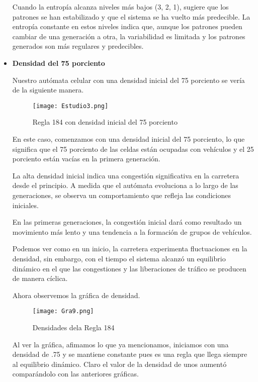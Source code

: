\documentclass{article}
\begin{document}
\begin{itemize}
		Cuando la entropía alcanza niveles más bajos (3, 2, 1), sugiere que los patrones se han estabilizado y que el sistema se ha vuelto más predecible. La entropía constante en estos niveles indica que, aunque los patrones pueden cambiar de una generación a otra, la variabilidad es limitada y los patrones generados son más regulares y predecibles.
		
		\item \textbf{Densidad del 75 porciento}
		
		Nuestro autómata celular con una densidad inicial del 75 porciento se vería de la siguiente manera.
		
		\begin{figure}[h]
			\centering       
			\texttt{[image: Estudio3.png]}
			\caption{Regla 184 con densidad inicial del 75 porciento}
			\label{fig:mi_imagen1}
		\end{figure}
		
		\vspace{300pt}
		En este caso, comenzamos con una densidad inicial del 75 porciento, lo que significa que el 75 porciento de las celdas están ocupadas con vehículos y el 25 porciento están vacías en la primera generación.
		
		La alta densidad inicial indica una congestión significativa en la carretera desde el principio. A medida que el autómata evoluciona a lo largo de las generaciones, se observa un comportamiento que refleja las condiciones iniciales.
		
		En las primeras generaciones, la congestión inicial dará como resultado un movimiento más lento y una tendencia a la formación de grupos de vehículos.
		
		Podemos ver como en un inicio, la carretera experimenta fluctuaciones en la densidad, sin embargo, con el tiempo el sistema alcanzó un equilibrio dinámico en el que las congestiones y las liberaciones de tráfico se producen de manera cíclica.
		
		Ahora observemos la gráfica de densidad.
		
		\begin{figure}[h]
			\centering       
			\texttt{[image: Gra9.png]}
			\caption{Densidades dela Regla 184}
			\label{fig:mi_imagen1}
		\end{figure}
		
		Al ver la gráfica, afimamos lo que ya mencionamos, iniciamos con una densidad de .75 y se mantiene constante pues es una regla que llega siempre al equilibrio dinámico. Claro el valor de la densidad de unos aumentó comparándolo con las anteriores gráficas. 
		

\end{itemize}
\end{document}
